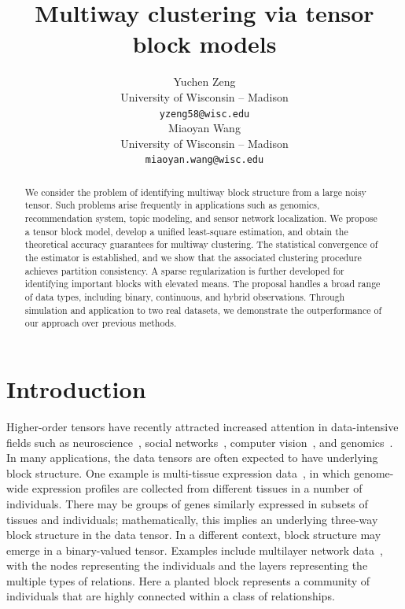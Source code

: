 \documentclass{article}
\title{Multiway clustering via tensor block models}
\author{%
Yuchen Zeng \\
 University of Wisconsin -- Madison\\
 \texttt{yzeng58@wisc.edu} \\
\And
Miaoyan Wang \\
 University of Wisconsin -- Madison\\
\texttt{miaoyan.wang@wisc.edu} \\
}
\begin{document}
\maketitle

\vspace{-.3cm}
\begin{abstract}
\vspace{-.2cm}

We consider the problem of identifying multiway block structure from a large noisy tensor. Such problems arise frequently in applications such as genomics, recommendation system, topic modeling, and sensor network localization. We propose a tensor block model, develop a unified least-square estimation, and obtain the theoretical accuracy guarantees for multiway clustering. The statistical convergence of the estimator is established, and we show that the associated clustering procedure achieves partition consistency. A sparse regularization is further developed for identifying important blocks with elevated means. The proposal handles a broad range of data types, including binary, continuous, and hybrid observations. Through simulation and application to two real datasets, we demonstrate the outperformance of our approach over previous methods. 
\end{abstract}

\section{Introduction}
\vspace{-.2cm}
Higher-order tensors have recently attracted increased attention in data-intensive fields such as neuroscience~\cite{cong2015tensor,zhou2013tensor}, social networks~\cite{nickel2011three,socher2013reasoning}, computer vision~\cite{tang2013tensor,liu2013tensor}, and genomics~\cite{wang2017three,hore2016tensor}. In many applications, the data tensors are often expected to have underlying block structure. One example is multi-tissue expression data~\cite{wang2017three}, in which genome-wide expression profiles are collected from different tissues in a number of individuals. There may be groups of genes similarly expressed in subsets of tissues and individuals; mathematically, this implies an underlying three-way block structure in the data tensor. In a different context, block structure may emerge in a binary-valued tensor. Examples include multilayer network data~\cite{nickel2011three}, with the nodes representing the individuals and the layers representing the multiple types of relations. Here a planted block represents a community of individuals that are highly connected within a class of relationships. 
\end{document}
